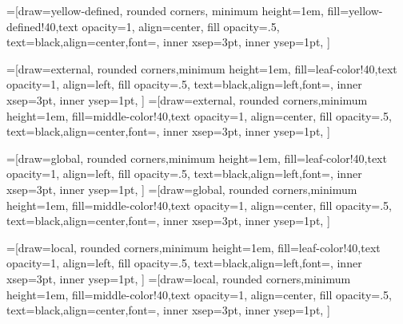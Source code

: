 \documentclass[acmsmall, screen]{acmart}
\begin{document}
\usetikzlibrary{trees}
\usetikzlibrary{matrix, patterns, positioning}







=[draw=yellow-defined,
    rounded corners, minimum height=1em,
    fill=yellow-defined!40,text opacity=1, align=center,
    fill opacity=.5,  text=black,align=center,font=\footnotesize,
    inner xsep=3pt,
    inner ysep=1pt,
]

=[draw=external,
    rounded corners,minimum height=1em,
    fill=leaf-color!40,text opacity=1, align=left,
    fill opacity=.5,  text=black,align=left,font=\footnotesize,
    inner xsep=3pt,
    inner ysep=1pt,
]
=[draw=external,
    rounded corners,minimum height=1em,
    fill=middle-color!40,text opacity=1, align=center,
    fill opacity=.5,  text=black,align=center,font=\footnotesize,
    inner xsep=3pt,
    inner ysep=1pt,
]
    
=[draw=global,
    rounded corners,minimum height=1em,
    fill=leaf-color!40,text opacity=1, align=left,
    fill opacity=.5,  text=black,align=left,font=\footnotesize,
    inner xsep=3pt,
    inner ysep=1pt,
]
=[draw=global,
    rounded corners,minimum height=1em,
    fill=middle-color!40,text opacity=1, align=center,
    fill opacity=.5,  text=black,align=center,font=\footnotesize,
    inner xsep=3pt,
    inner ysep=1pt,
]

=[draw=local,
    rounded corners,minimum height=1em,
    fill=leaf-color!40,text opacity=1, align=left,
    fill opacity=.5,  text=black,align=left,font=\footnotesize,
    inner xsep=3pt,
    inner ysep=1pt,
]
=[draw=local,
    rounded corners,minimum height=1em,
    fill=middle-color!40,text opacity=1, align=center,
    fill opacity=.5,  text=black,align=center,font=\footnotesize,
    inner xsep=3pt,
    inner ysep=1pt,
]
\end{document}
